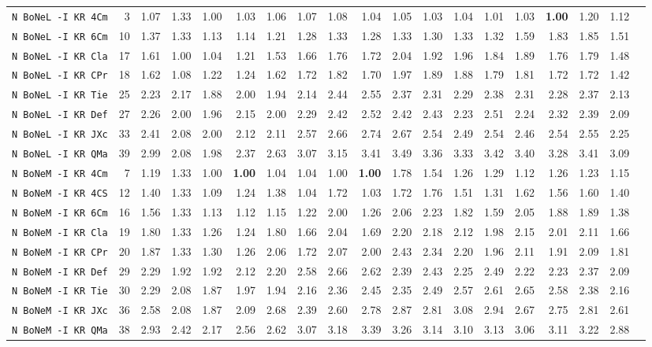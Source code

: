 \begin{tabular}{l | r @{~~} r | r@{~~}r@{~~}r@{~~}r@{~~}r@{~~}r@{~~}r@{~~}r@{~~}r@{~~}r@{~~}r@{~~}r@{~~}r@{~~}r@{~~}r@{~~}r|}
\verb+N BoNeL -I KR 4Cm+ & 3 & 1.07 & 1.33&1.00&1.03&1.06&1.07&1.08&1.04&1.05&1.03&1.04&1.01&1.03&\textbf{1.00}&1.20&1.12\\
\verb+N BoNeL -I KR 6Cm+ & 10 & 1.37 & 1.33&1.13&1.14&1.21&1.28&1.33&1.28&1.33&1.30&1.33&1.32&1.59&1.83&1.85&1.51\\
\verb+N BoNeL -I KR Cla+ & 17 & 1.61 & 1.00&1.04&1.21&1.53&1.66&1.76&1.72&2.04&1.92&1.96&1.84&1.89&1.76&1.79&1.48\\
\verb+N BoNeL -I KR CPr+ & 18 & 1.62 & 1.08&1.22&1.24&1.62&1.72&1.82&1.70&1.97&1.89&1.88&1.79&1.81&1.72&1.72&1.42\\
\verb+N BoNeL -I KR Tie+ & 25 & 2.23 & 2.17&1.88&2.00&1.94&2.14&2.44&2.55&2.37&2.31&2.29&2.38&2.31&2.28&2.37&2.13\\
\verb+N BoNeL -I KR Def+ & 27 & 2.26 & 2.00&1.96&2.15&2.00&2.29&2.42&2.52&2.42&2.43&2.23&2.51&2.24&2.32&2.39&2.09\\
\verb+N BoNeL -I KR JXc+ & 33 & 2.41 & 2.08&2.00&2.12&2.11&2.57&2.66&2.74&2.67&2.54&2.49&2.54&2.46&2.54&2.55&2.25\\
\verb+N BoNeL -I KR QMa+ & 39 & 2.99 & 2.08&1.98&2.37&2.63&3.07&3.15&3.41&3.49&3.36&3.33&3.42&3.40&3.28&3.41&3.09\smallskip \\
\verb+N BoNeM -I KR 4Cm+ & 7 & 1.19 & 1.33&1.00&\textbf{1.00}&1.04&1.04&1.00&\textbf{1.00}&1.78&1.54&1.26&1.29&1.12&1.26&1.23&1.15\\
\verb+N BoNeM -I KR 4CS+ & 12 & 1.40 & 1.33&1.09&1.24&1.38&1.04&1.72&1.03&1.72&1.76&1.51&1.31&1.62&1.56&1.60&1.40\\
\verb+N BoNeM -I KR 6Cm+ & 16 & 1.56 & 1.33&1.13&1.12&1.15&1.22&2.00&1.26&2.06&2.23&1.82&1.59&2.05&1.88&1.89&1.38\\
\verb+N BoNeM -I KR Cla+ & 19 & 1.80 & 1.33&1.26&1.24&1.80&1.66&2.04&1.69&2.20&2.18&2.12&1.98&2.15&2.01&2.11&1.66\\
\verb+N BoNeM -I KR CPr+ & 20 & 1.87 & 1.33&1.30&1.26&2.06&1.72&2.07&2.00&2.43&2.34&2.20&1.96&2.11&1.91&2.09&1.81\\
\verb+N BoNeM -I KR Def+ & 29 & 2.29 & 1.92&1.92&2.12&2.20&2.58&2.66&2.62&2.39&2.43&2.25&2.49&2.22&2.23&2.37&2.09\\
\verb+N BoNeM -I KR Tie+ & 30 & 2.29 & 2.08&1.87&1.97&1.94&2.16&2.36&2.45&2.35&2.49&2.57&2.61&2.65&2.58&2.38&2.16\\
\verb+N BoNeM -I KR JXc+ & 36 & 2.58 & 2.08&1.87&2.09&2.68&2.39&2.60&2.78&2.87&2.81&3.08&2.94&2.67&2.75&2.81&2.61\\
\verb+N BoNeM -I KR QMa+ & 38 & 2.93 & 2.42&2.17&2.56&2.62&3.07&3.18&3.39&3.26&3.14&3.10&3.13&3.06&3.11&3.22&2.88\smallskip \\

\end{tabular}
